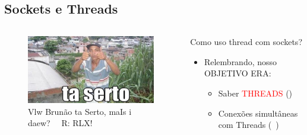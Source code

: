 \documentclass[10pt, xcolor=x11names]{beamer}
\begin{document}
\subsection{Sockets e Threads}
\begin{frame}
	\begin{columns}
			\begin{figure}
				\includegraphics[width=.8\linewidth]{img/taserto.png}
				\caption{Vlw Brunão ta Serto, maIs i daew? ~~R: RLX!}
			\end{figure}
		

		\begin{block}{Como uso thread com sockets?}
			\begin{itemize}
				\item Relembrando, nosso OBJETIVO ERA:
					\begin{itemize}
						\item Saber \textcolor{red}{THREADS} (\checkmark)
						\item Conexões simultâneas com Threads (~)
					\end{itemize}
			\end{itemize}
		\end{block}
		
	\end{columns}
\end{frame}
\end{document}
